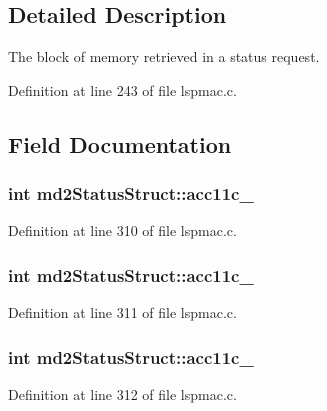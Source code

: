 \subsection{Detailed Description}
The block of memory retrieved in a status request. 

Definition at line 243 of file lspmac.\-c.



\subsection{Field Documentation}
\hypertarget{structmd2StatusStruct_a69fc2e30a5de0a11c992d133e7a761cd}{
\subsubsection[{acc11c\-\_\-1}]{\setlength{\rightskip}{0pt plus 5cm}int md2\-Status\-Struct\-::acc11c\-\_}}\label{structmd2StatusStruct_a69fc2e30a5de0a11c992d133e7a761cd}


Definition at line 310 of file lspmac.\-c.

\hypertarget{structmd2StatusStruct_ad186f06cb4670b00b8af8264d1da66a4}{
\subsubsection[{acc11c\-\_\-2}]{\setlength{\rightskip}{0pt plus 5cm}int md2\-Status\-Struct\-::acc11c\-\_}}\label{structmd2StatusStruct_ad186f06cb4670b00b8af8264d1da66a4}


Definition at line 311 of file lspmac.\-c.

\hypertarget{structmd2StatusStruct_a20a15620e12888f61c0aed1e47e97932}{
\subsubsection[{acc11c\-\_\-3}]{\setlength{\rightskip}{0pt plus 5cm}int md2\-Status\-Struct\-::acc11c\-\_}}\label{structmd2StatusStruct_a20a15620e12888f61c0aed1e47e97932}


Definition at line 312 of file lspmac.\-c.

